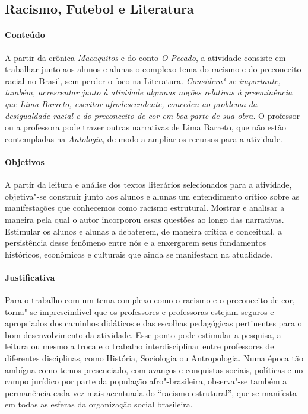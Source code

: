 \documentclass[11pt]{extarticle}
\begin{document}
{{\subsection{Racismo, Futebol e Literatura}


\paragraph{Conteúdo} A partir da crônica {\textit{Macaquitos}} e do
conto {\textit{O Pecado}}, a atividade consiste em trabalhar junto
aos alunos e alunas o complexo tema do racismo e do preconceito racial
no Brasil, sem perder o foco na Literatura. \emph{Considera"-se
importante, também, acrescentar junto à atividade algumas noções
relativas à preeminência que Lima Barreto, escritor afrodescendente,
concedeu ao problema da desigualdade racial e do preconceito de cor em
boa parte de sua obra.} O professor ou a professora pode trazer outras
narrativas de Lima Barreto, que não estão contempladas na
\emph{Antologia}, de modo a ampliar os recursos para a atividade.






\paragraph{Objetivos} A partir da leitura e análise dos textos literários
selecionados para a atividade, objetiva"-se construir junto aos alunos e
alunas um entendimento crítico sobre as manifestações que conhecemos
como racismo estrutural. Mostrar e analisar a maneira pela qual o autor
incorporou essas questões ao longo das narrativas. Estimular os alunos e
alunas a debaterem, de maneira crítica e conceitual, a persistência
desse fenômeno entre nós e a enxergarem seus fundamentos históricos,
econômicos e culturais que ainda se manifestam na atualidade.

\paragraph{Justificativa} Para o trabalho com um tema complexo como o
racismo e o preconceito de cor, torna"-se imprescindível que os
professores e professoras estejam seguros e apropriados dos caminhos
didáticos e das escolhas pedagógicas pertinentes para o bom
desenvolvimento da atividade. Esse ponto pode estimular a pesquisa,
a leitura ou mesmo a troca e o trabalho interdisciplinar entre professores
de diferentes disciplinas, como História, Sociologia ou Antropologia.
Numa época tão ambígua como temos presenciado, com avanços e conquistas
sociais, políticas e no campo jurídico por parte da população
afro"-brasileira, observa"-se também a permanência cada vez mais acentuada
do ``racismo estrutural'', que se manifesta em todas as esferas da
organização social brasileira.

}}
\end{document}
